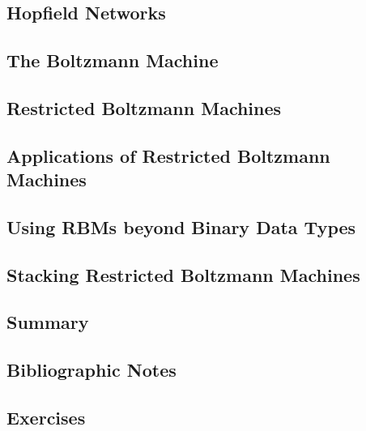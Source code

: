 \documentclass[a4paper]{article}
\begin{document}
\subsection{Hopfield Networks}

\subsection{The Boltzmann Machine}

\subsection{Restricted Boltzmann Machines}

\subsection{Applications of Restricted Boltzmann Machines}

\subsection{Using RBMs beyond Binary Data Types}

\subsection{Stacking Restricted Boltzmann Machines}

\subsection{Summary}


\subsection{Bibliographic Notes}

\subsection{Exercises}
\end{document}
